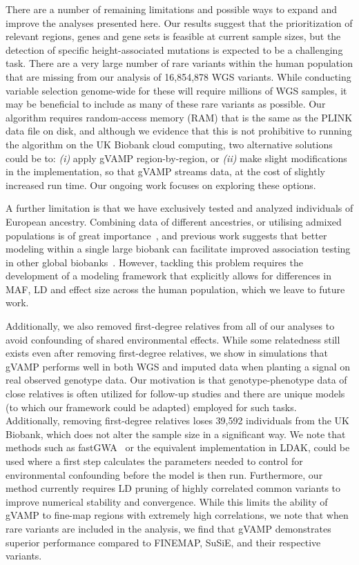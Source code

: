 There are a number of remaining limitations and possible ways to expand and improve the analyses presented here. Our results suggest that the prioritization of relevant regions, genes and gene sets is feasible at current sample sizes, but the detection of specific height-associated mutations is expected to be a challenging task. There are a very large number of rare variants within the human population that are missing from our analysis of 16,854,878 WGS variants. While conducting variable selection genome-wide for these will require millions of WGS samples, it may be beneficial to include as many of these rare variants as possible. Our algorithm requires random-access memory (RAM) that is the same as the PLINK data file on disk, and although we evidence that this is not prohibitive to running the algorithm on the UK Biobank cloud computing, two alternative solutions could be to: \emph{(i)} apply gVAMP region-by-region, or \emph{(ii)} make slight modifications in the implementation, so that gVAMP streams data, at the cost of slightly increased run time. Our ongoing work focuses on exploring these options.

A further limitation is that we have exclusively tested and analyzed individuals of European ancestry. Combining data of different ancestries, or utilising admixed populations is of great importance~\cite{world}, and previous work suggests that better modeling within a single large biobank can facilitate improved association testing in other global biobanks~\cite{crosspred}. However, tackling this problem requires the development of a modeling framework that explicitly allows for differences in MAF, LD and effect size across the human population, which we leave to future work. 

Additionally, we also removed first-degree relatives from all of our analyses to avoid confounding of shared environmental effects. While some relatedness still exists even after removing first-degree relatives, we show in simulations that gVAMP performs well in both WGS and imputed data when planting a signal on real observed genotype data. Our motivation is that genotype-phenotype data of close relatives is often utilized for follow-up studies and there are unique models (to which our framework could be adapted) employed for such tasks. Additionally, removing first-degree relatives loses 39,592 individuals from the UK Biobank, which does not alter the sample size in a significant way. We note that methods such as fastGWA~\cite{fastGWAglm} or the equivalent implementation in LDAK, could be used where a first step calculates the parameters needed to control for environmental confounding before the model is then run. Furthermore, our method currently requires LD pruning of highly correlated common variants to improve numerical stability and convergence. While this limits the ability of gVAMP to fine-map regions with extremely high correlations, we note that when rare variants are included in the analysis, we find that gVAMP demonstrates superior performance compared to FINEMAP, SuSiE, and their respective variants.


